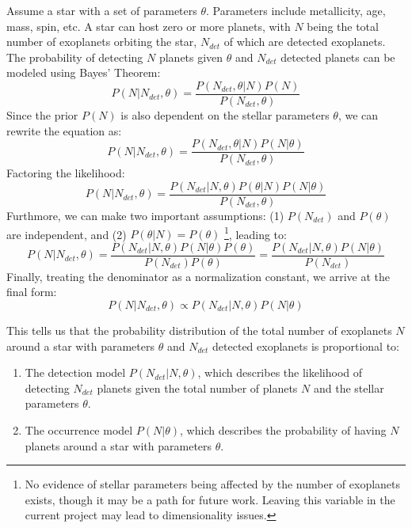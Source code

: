 \documentclass[preprint]{aastex631}
\begin{document}
Assume a star with a set of parameters $\theta$. Parameters include metallicity, age, mass, spin, etc. A star can host zero or more planets, with $N$ being the total number of exoplanets orbiting the star, $N_{det}$ of which are detected exoplanets. The probability of detecting $N$ planets given $\theta$ and $N_{det}$ detected planets can be modeled using Bayes' Theorem:
\begin{equation}
  \label{eq1}
  P(N | N_{det}, \theta) = \frac{P(N_{det},\theta | N) P(N)}{P(N_{det},\theta)}
\end{equation}
Since the prior $P(N)$ is also dependent on the stellar parameters $\theta$, we can rewrite the equation as:
\begin{equation}
  P(N | N_{det}, \theta) = \frac{P(N_{det},\theta | N) P(N | \theta)}{P(N_{det},\theta)}
\end{equation}
Factoring the likelihood:
\begin{equation}
  P(N | N_{det}, \theta) = \frac{P(N_{det} | N,\theta ) P(\theta | N) P(N | \theta)}{P(N_{det},\theta)}
\end{equation}
Furthmore, we can make two important assumptions: (1) $P(N_{det})$ and $P(\theta)$ are independent, and (2) $P(\theta | N) = P(\theta)$ \footnote{No evidence of stellar parameters being affected by the number of exoplanets exists, though it may be a path for future work. Leaving this variable in the current project may lead to dimensionality issues.}, leading to:
\begin{equation}
  P(N | N_{det}, \theta) = \frac{P(N_{det} | N,\theta ) P(N | \theta) P(\theta)}{P(N_{det})P(\theta)} = \frac{P(N_{det} | N,\theta ) P(N | \theta)}{P(N_{det})}
\end{equation}
Finally, treating the denominator as a normalization constant, we arrive at the final form:
\begin{equation}
  P(N | N_{det}, \theta) \propto P(N_{det} | N,\theta ) P(N | \theta)
\end{equation}

This tells us that the probability distribution of the total number of exoplanets $N$ around a star with parameters $\theta$ and $N_{det}$ detected exoplanets is proportional to:
\begin{enumerate}
  \item The detection model $P(N_{det} | N,\theta )$, which describes the likelihood of detecting $N_{det}$ planets given the total number of planets $N$ and the stellar parameters $\theta$.
  \item The occurrence model $P(N | \theta)$, which describes the probability of having $N$ planets around a star with parameters $\theta$.
\end{enumerate}
\end{document}
